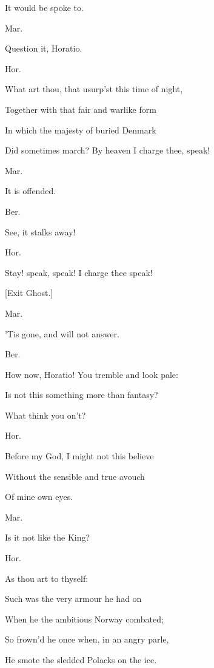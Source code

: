 \documentclass[12pt]{book}
\begin{document}
It would be spoke to.



Mar.

Question it, Horatio.



Hor.

What art thou, that usurp'st this time of night,

Together with that fair and warlike form

In which the majesty of buried Denmark

Did sometimes march? By heaven I charge thee, speak!



Mar.

It is offended.



Ber.

See, it stalks away!



Hor.

Stay! speak, speak! I charge thee speak!



[Exit Ghost.]



Mar.

'Tis gone, and will not answer.



Ber.

How now, Horatio! You tremble and look pale:

Is not this something more than fantasy?

What think you on't?



Hor.

Before my God, I might not this believe

Without the sensible and true avouch

Of mine own eyes.



Mar.

Is it not like the King?



Hor.

As thou art to thyself:

Such was the very armour he had on

When he the ambitious Norway combated;

So frown'd he once when, in an angry parle,

He smote the sledded Polacks on the ice.
\end{document}
